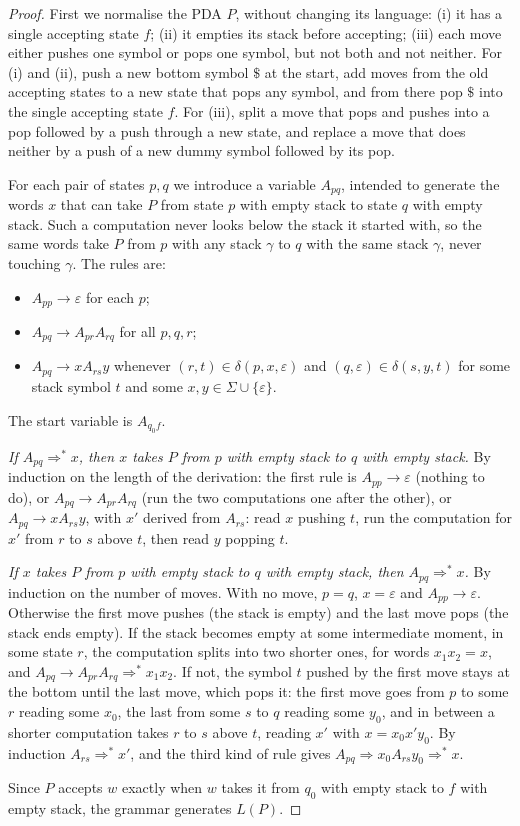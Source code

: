 \begin{proof}
First we normalise the PDA $P$, without changing its language: (i) it has a single accepting state $f$; (ii) it empties its stack before accepting; (iii) each move either pushes one symbol or pops one symbol, but not both and not neither. For (i) and (ii), push a new bottom symbol $\$$ at the start, add moves from the old accepting states to a new state that pops any symbol, and from there pop $\$$ into the single accepting state $f$. For (iii), split a move that pops and pushes into a pop followed by a push through a new state, and replace a move that does neither by a push of a new dummy symbol followed by its pop.

For each pair of states $p,q$ we introduce a variable $A_{pq}$, intended to generate the words $x$ that can take $P$ from state $p$ with empty stack to state $q$ with empty stack. Such a computation never looks below the stack it started with, so the same words take $P$ from $p$ with any stack $\gamma$ to $q$ with the same stack $\gamma$, never touching $\gamma$. The rules are:
\begin{itemize}
\item $A_{pp}\to\varepsilon$ for each $p$;
\item $A_{pq}\to A_{pr}A_{rq}$ for all $p,q,r$;
\item $A_{pq}\to xA_{rs}y$ whenever $(r,t)\in\delta(p,x,\varepsilon)$ and $(q,\varepsilon)\in\delta(s,y,t)$ for some stack symbol $t$ and some $x,y\in\Sigma\cup\{\varepsilon\}$.
\end{itemize}
The start variable is $A_{q_0f}$.

\emph{If $A_{pq}\Rightarrow^*x$, then $x$ takes $P$ from $p$ with empty stack to $q$ with empty stack.} By induction on the length of the derivation: the first rule is $A_{pp}\to\varepsilon$ (nothing to do), or $A_{pq}\to A_{pr}A_{rq}$ (run the two computations one after the other), or $A_{pq}\to xA_{rs}y$, with $x'$ derived from $A_{rs}$: read $x$ pushing $t$, run the computation for $x'$ from $r$ to $s$ above $t$, then read $y$ popping $t$.

\emph{If $x$ takes $P$ from $p$ with empty stack to $q$ with empty stack, then $A_{pq}\Rightarrow^*x$.} By induction on the number of moves. With no move, $p=q$, $x=\varepsilon$ and $A_{pp}\to\varepsilon$. Otherwise the first move pushes (the stack is empty) and the last move pops (the stack ends empty). If the stack becomes empty at some intermediate moment, in some state $r$, the computation splits into two shorter ones, for words $x_1x_2=x$, and $A_{pq}\to A_{pr}A_{rq}\Rightarrow^*x_1x_2$. If not, the symbol $t$ pushed by the first move stays at the bottom until the last move, which pops it: the first move goes from $p$ to some $r$ reading some $x_0$, the last from some $s$ to $q$ reading some $y_0$, and in between a shorter computation takes $r$ to $s$ above $t$, reading $x'$ with $x=x_0x'y_0$. By induction $A_{rs}\Rightarrow^*x'$, and the third kind of rule gives $A_{pq}\Rightarrow x_0A_{rs}y_0\Rightarrow^*x$.

Since $P$ accepts $w$ exactly when $w$ takes it from $q_0$ with empty stack to $f$ with empty stack, the grammar generates $L(P)$.
\end{proof}

